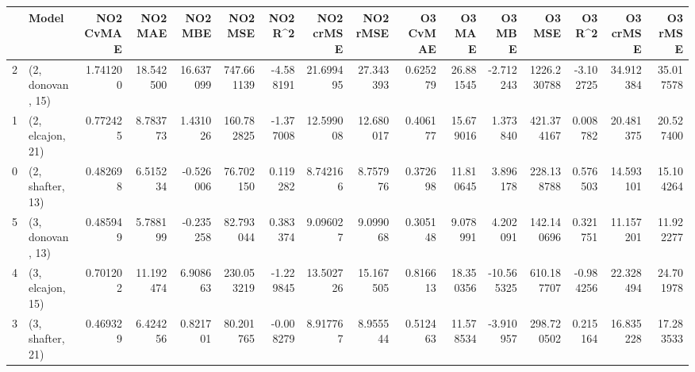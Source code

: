 \begin{tabular}{llrrrrrrrrrrrrrr}
\toprule
{} &             Model &  NO2 CvMAE &    NO2 MAE &    NO2 MBE &     NO2 MSE &   NO2 R\textasciicircum2 &  NO2 crMSE &   NO2 rMSE &  O3 CvMAE &     O3 MAE &     O3 MBE &       O3 MSE &    O3 R\textasciicircum2 &   O3 crMSE &    O3 rMSE \\
\midrule
2 &  (2, donovan, 15) &   1.741200 &  18.542500 &  16.637099 &  747.661139 & -4.588191 &  21.699495 &  27.343393 &  0.625279 &  26.881545 &  -2.712243 &  1226.230788 & -3.102725 &  34.912384 &  35.017578 \\
1 &  (2, elcajon, 21) &   0.772425 &   8.783773 &   1.431026 &  160.782825 & -1.377008 &  12.599008 &  12.680017 &  0.406177 &  15.679016 &   1.373840 &   421.374167 &  0.008782 &  20.481375 &  20.527400 \\
0 &  (2, shafter, 13) &   0.482698 &   6.515234 &  -0.526006 &   76.702150 &  0.119282 &   8.742166 &   8.757976 &  0.372698 &  11.810645 &   3.896178 &   228.138788 &  0.576503 &  14.593101 &  15.104264 \\
5 &  (3, donovan, 13) &   0.485949 &   5.788199 &  -0.235258 &   82.793044 &  0.383374 &   9.096027 &   9.099068 &  0.305148 &   9.078991 &   4.202091 &   142.140696 &  0.321751 &  11.157201 &  11.922277 \\
4 &  (3, elcajon, 15) &   0.701202 &  11.192474 &   6.908663 &  230.053219 & -1.229845 &  13.502726 &  15.167505 &  0.816613 &  18.350356 & -10.565325 &   610.187707 & -0.984256 &  22.328494 &  24.701978 \\
3 &  (3, shafter, 21) &   0.469329 &   6.424256 &   0.821701 &   80.201765 & -0.008279 &   8.917767 &   8.955544 &  0.512463 &  11.578534 &  -3.910957 &   298.720502 &  0.215164 &  16.835228 &  17.283533 \\
\bottomrule
\end{tabular}
